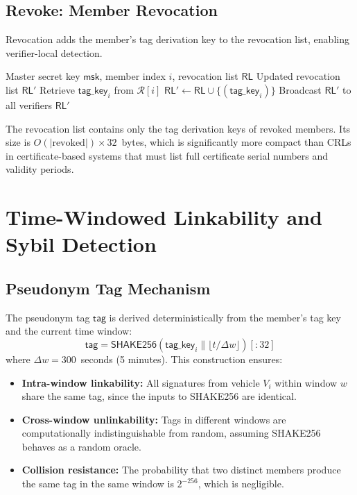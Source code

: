 \documentclass[conference,10pt]{IEEEtran}
\newcommand{\shake}{\textsf{SHAKE256}}
\begin{document}
\subsection{Revoke: Member Revocation}

Revocation adds the member's tag derivation key to the revocation list, enabling verifier-local detection.

\begin{algorithm}[h]
\caption{$\mathsf{Revoke}(\mathsf{msk}, i, \mathsf{RL})$: Member Revocation}
\label{alg:revoke}
\begin{algorithmic}[1]
\REQUIRE Master secret key $\mathsf{msk}$, member index $i$, revocation list $\mathsf{RL}$
\ENSURE Updated revocation list $\mathsf{RL}'$
\STATE Retrieve $\mathsf{tag\_key}_i$ from $\mathcal{R}[i]$
\STATE $\mathsf{RL}' \leftarrow \mathsf{RL} \cup \{(\mathsf{tag\_key}_i)\}$
\STATE Broadcast $\mathsf{RL}'$ to all verifiers
\RETURN $\mathsf{RL}'$
\end{algorithmic}
\end{algorithm}

The revocation list contains only the tag derivation keys of revoked members. Its size is $O(|\text{revoked}|) \times 32$~bytes, which is significantly more compact than CRLs in certificate-based systems that must list full certificate serial numbers and validity periods.

\section{Time-Windowed Linkability and Sybil Detection}
\label{sec:linkability}

\subsection{Pseudonym Tag Mechanism}

The pseudonym tag $\mathsf{tag}$ is derived deterministically from the member's tag key and the current time window:
\begin{equation}
\mathsf{tag} = \shake(\mathsf{tag\_key}_i \| \lfloor t / \Delta w \rfloor)[:32]
\label{eq:tag}
\end{equation}
where $\Delta w = 300$~seconds (5 minutes). This construction ensures:

\begin{itemize}
    \item \textbf{Intra-window linkability:} All signatures from vehicle $V_i$ within window $w$ share the same tag, since the inputs to \shake{} are identical.
    \item \textbf{Cross-window unlinkability:} Tags in different windows are computationally indistinguishable from random, assuming \shake{} behaves as a random oracle.
    \item \textbf{Collision resistance:} The probability that two distinct members produce the same tag in the same window is $2^{-256}$, which is negligible.
\end{itemize}
\end{document}
